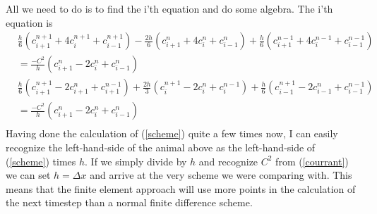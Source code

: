 \documentclass[a4paper,english, 10pt, twoside]{article}
\begin{document}
All we need to do is to find the i'th equation and do some algebra. The i'th equation is
\begin{align*}
 &\frac{h}{6}(c^{n+1}_{i+1} + 4c^{n+1}_{i} + c^{n+1}_{i-1}) -\frac{2h}{6}(c^{n}_{i+1} + 4c^{n}_{i} + c^{n}_{i-1}) + 
 \frac{h}{6}(c^{n-1}_{i+1} +4c^{n-1}_{i} + c^{n-1}_{i-1})\\ 
 &= \frac{-C^2}{h}(c^{n}_{i+1} -2c^{n}_{i} +c^{n}_{i-1} ) \\
 &\frac{h}{6}(c^{n+1}_{i+1} -2c^{n}_{i+1} + c^{n-1}_{i+1}) +\frac{2h}{3}(c^{n+1}_{i}-2c^{n}_{i}+c^{n-1}_{i}) + 
 \frac{h}{6}(c^{n+1}_{i-1}-2c^{n}_{i-1}+c^{n-1}_{i-1}) \\
 &= \frac{-C^2}{h}(c^{n}_{i+1} -2c^{n}_{i} +c^{n}_{i-1} ) \\ 
\end{align*}
Having done the calculation of (\ref{scheme}) quite a few times now, I can easily recognize the left-hand-side of the animal 
above as the left-hand-side of (\ref{scheme}) times $h$. If we simply divide by $h$ and recognize $C^2$ from (\ref{courrant}) we 
can set $h = \Delta x$ and arrive at the very scheme we were comparing with. This means that the finite element approach will 
use more points in the calculation of the next timestep than a normal finite difference scheme.
\end{document}
